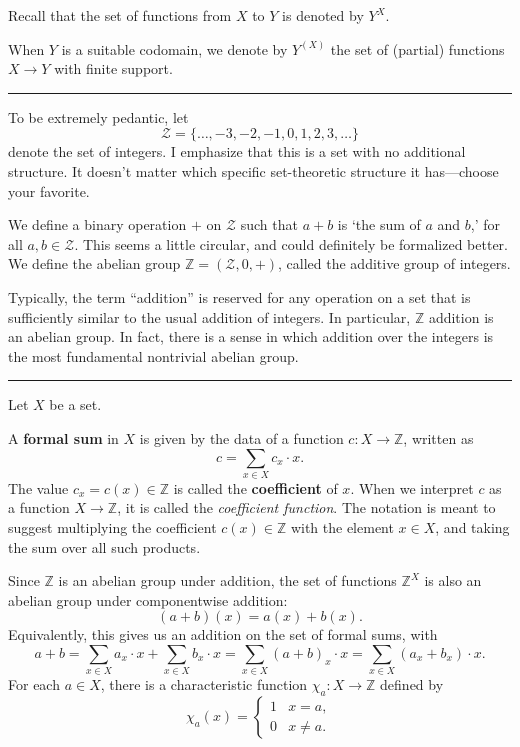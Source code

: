 \documentclass[12pt]{article}
\newcommand{\keyword}[1]{\textbf{#1}}
\newcommand{\sepline}{\rule{\textwidth}{0.4pt}}
\theoremstyle{definition}
\newcommand{\Z}{\mathbb{Z}}
\newcommand{\ZZ}{\mathcal{Z}}
\newcommand{\<}{\left\langle}
\renewcommand{\>}{\right\rangle}
\renewcommand{\_}[1]{{_{#1}}}
\begin{document}
Recall that the set of functions from $X$ to $Y$ is denoted by $Y^X$.

When $Y$ is a suitable codomain, we denote by $Y^{(X)}$ the set of (partial) functions $X \to Y$ with finite support.


\sepline

To be extremely pedantic, let
\[
    \ZZ = \{\dots, -3, -2, -1, 0, 1, 2, 3, \dots\}
\]
denote the set of integers.
I emphasize that this is a set with no additional structure.
It doesn't matter which specific set-theoretic structure it has---choose your favorite.

We define a binary operation $+$ on $\ZZ$ such that $a + b$ is `the sum of $a$ and $b$,' for all $a, b \in \ZZ$.
This seems a little circular, and could definitely be formalized better.
We define the abelian group $\Z = (\ZZ, 0, +)$, called the additive group of integers.

Typically, the term ``addition'' is reserved for any operation on a set that is sufficiently similar to the usual addition of integers.
In particular, $\Z$ addition is an abelian group.
In fact, there is a sense in which addition over the integers is the most fundamental nontrivial abelian group.



\sepline

Let $X$ be a set.

A \keyword{formal sum} in $X$ is given by the data of a function $c : X \to \Z$, written as
\[
    c = \sum_{x \in X} c_x \cdot x.
\]
The value $c_x = c(x) \in \Z$ is called the \keyword{coefficient} of $x$.
When we interpret $c$ as a function $X \to \Z$, it is called the \emph{coefficient function}.
The notation is meant to suggest multiplying the coefficient $c(x) \in \Z$ with the element $x \in X$, and taking the sum over all such products.

Since $\Z$ is an abelian group under addition, the set of functions $\Z^X$ is also an abelian group under componentwise addition:
\[
    (a + b)(x) = a(x) + b(x).
\]
Equivalently, this gives us an addition on the set of formal sums, with
\[
    a + b
        = \sum_{x \in X} a_x \cdot x + \sum_{x \in X} b_x \cdot x
        = \sum_{x \in X} (a + b)_x \cdot x
        = \sum_{x \in X} (a_x + b_x) \cdot x.
\]
For each $a \in X$, there is a characteristic function $\chi_a : X \to \Z$ defined by
\[
    \chi_a(x) = \begin{cases}
        1 & x = a, \\
        0 & x \ne a.
    \end{cases}
\]
\end{document}
